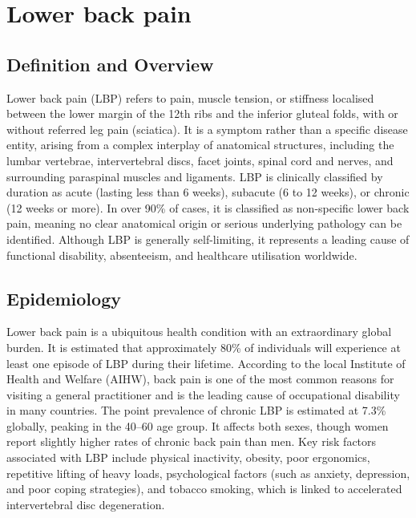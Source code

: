\chapter{Lower back pain}

\section*{Definition and Overview}
Lower back pain (LBP) refers to pain, muscle tension, or stiffness localised between the lower margin of the 12th ribs and the inferior gluteal folds, with or without referred leg pain (sciatica). It is a symptom rather than a specific disease entity, arising from a complex interplay of anatomical structures, including the lumbar vertebrae, intervertebral discs, facet joints, spinal cord and nerves, and surrounding paraspinal muscles and ligaments. LBP is clinically classified by duration as acute (lasting less than 6 weeks), subacute (6 to 12 weeks), or chronic (12 weeks or more). In over 90\% of cases, it is classified as non-specific lower back pain, meaning no clear anatomical origin or serious underlying pathology can be identified. Although LBP is generally self-limiting, it represents a leading cause of functional disability, absenteeism, and healthcare utilisation worldwide.

\section*{Epidemiology}
Lower back pain is a ubiquitous health condition with an extraordinary global burden. It is estimated that approximately 80\% of individuals will experience at least one episode of LBP during their lifetime. According to the local Institute of Health and Welfare (AIHW), back pain is one of the most common reasons for visiting a general practitioner and is the leading cause of occupational disability in many countries. The point prevalence of chronic LBP is estimated at 7.3\% globally, peaking in the 40--60 age group. It affects both sexes, though women report slightly higher rates of chronic back pain than men. Key risk factors associated with LBP include physical inactivity, obesity, poor ergonomics, repetitive lifting of heavy loads, psychological factors (such as anxiety, depression, and poor coping strategies), and tobacco smoking, which is linked to accelerated intervertebral disc degeneration.


